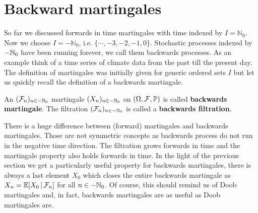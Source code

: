 \section{Backward martingales}
So far we discussed forwards in time martingales with time indexed by $I =\mathbb{N}_0$. Now we choose $I = -\mathbb{N}_0$, i.e. $\{\cdots,-3,-2,-1,0\}$. Stochastic processes indexed by $-\N_0$ have been running forever, we call them backwards processes. As an example think of a time series of climate data from the past till the present day. The definition of martingales was initially given for generic ordered sets $I$ but let us quickly recall the definition of a backwards martingale.
\begin{ldef}
\begin{deff}
	An $(\mathcal F_n)_{n \in -\N_0}$ martingale $(X_n)_{n\in-\N_0}$  on $(\Omega, \mathcal F, \P)$ is called \textbf{backwards martingale}. The filtration $(\mathcal F_n)_{n\in-\N_0}$ is called a \textbf{backwards filtration}.

\end{deff}
\end{ldef}
There is a huge difference between (forward) martingales and backwards martingales. Those are not symmetric concepts as backwards process do not run in the negative time direction. The filtration grows forwards in time and the martingale property also holds forwards in time. In the light of the previous section we get a particularly useful property for backwards martingales, there is always a last element $X_0$ which closes the entire backwards martingale as $X_{n} = \E[X_0\,|\,\cF_{n}]$ for all $n\in -\N_0$. Of course, this should remind us of Doob martingales and, in fact, backwards martingales are as useful as Doob martingales are.

